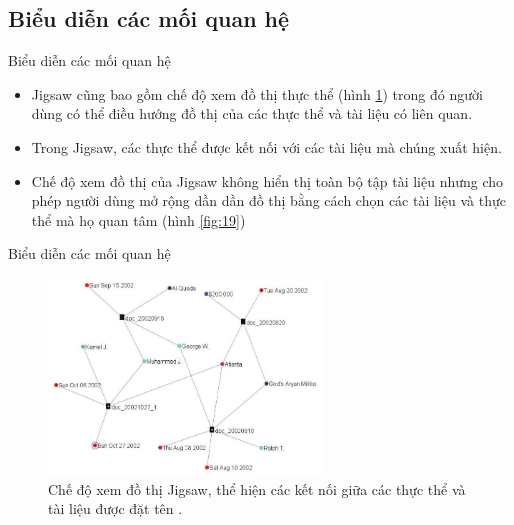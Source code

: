 \documentclass[10pt]{beamer}
\theoremstyle{remark}
\theoremstyle{definition}
\begin{document}
\subsection{Biểu diễn các mối quan hệ}

\begin{frame}{Biểu diễn các mối quan hệ}
	\begin{itemize}
		\item Jigsaw \cite{155} cũng bao gồm chế độ xem đồ thị thực thể (hình \ref{fig:18}) trong đó người dùng có thể điều hướng đồ thị của các thực thể và tài liệu có liên quan.
		\item Trong Jigsaw, các thực thể được kết nối với các tài liệu mà chúng xuất hiện.
		\item Chế độ xem đồ thị của Jigsaw không hiển thị toàn bộ tập tài liệu nhưng cho phép người dùng mở rộng dần dần đồ thị bằng cách chọn các tài liệu và thực thể mà họ quan tâm (hình \ref{fig:19})
	\end{itemize}
\end{frame}

\begin{frame}{Biểu diễn các mối quan hệ}
	\begin{figure}[h!]
        \centering
        \includegraphics[width=0.65\textwidth]{18.png}
        \caption{Chế độ xem đồ thị Jigsaw, thể hiện các kết nối giữa các thực thể và tài liệu được đặt tên \cite{155}.}
        \label{fig:18}
    \end{figure}
\end{frame}
\end{document}
